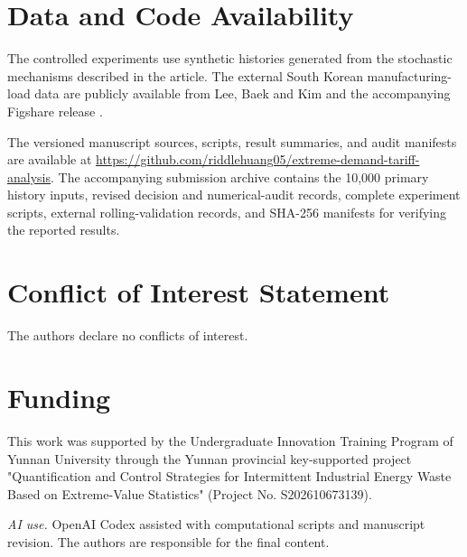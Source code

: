 \documentclass[suppldata]{interact}
\begin{document}
\section*{Data and Code Availability}
The controlled experiments use synthetic histories generated from the
stochastic mechanisms described in the article. The external
South Korean manufacturing-load data are publicly available from Lee,
Baek and Kim \citep{Lee2022KoreanFactories} and the accompanying
Figshare release \citep{LeeFigshareV9}.

The versioned manuscript sources, scripts, result summaries, and audit
manifests are available at\newline
\url{https://github.com/riddlehuang05/extreme-demand-tariff-analysis}.
The accompanying submission archive contains the 10,000 primary
history inputs, revised decision and numerical-audit records,
complete experiment scripts, external rolling-validation records,
and SHA-256 manifests for verifying the reported results.

\section*{Conflict of Interest Statement}
The authors declare no conflicts of interest.


\section*{Funding}
This work was supported by the Undergraduate Innovation Training Program of Yunnan University through the Yunnan provincial key-supported project "Quantification and Control Strategies for Intermittent Industrial Energy Waste Based on Extreme-Value Statistics" (Project No. S202610673139).

\noindent\textit{AI use.} OpenAI Codex assisted with computational scripts and manuscript
revision. The authors are responsible for the final content.

\renewcommand{\bibfont}{\normalfont\fontsize{12}{16}\selectfont}


\end{document}
